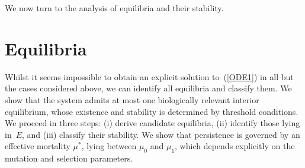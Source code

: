\documentclass[12pt]{article}
\begin{document}
We now turn to the analysis of equilibria and their stability.

\section{Equilibria}

Whilst it seems impossible to obtain an explicit solution
to~(\ref{ODE1}) in all but the cases considered above, we can identify
all equilibria and classify them. We show that the system admits at most
one biologically relevant interior equilibrium, whose existence and
stability is determined by threshold conditions. We proceed in three
steps: (i) derive candidate equilibria, (ii) identify those lying in~$E$, 
and (iii) classify their stability.
We show that persistence is governed by an effective mortality $\mu^*$, 
lying between $\mu_0$ and $\mu_1$, which depends explicitly on the mutation 
and selection parameters.
\end{document}
